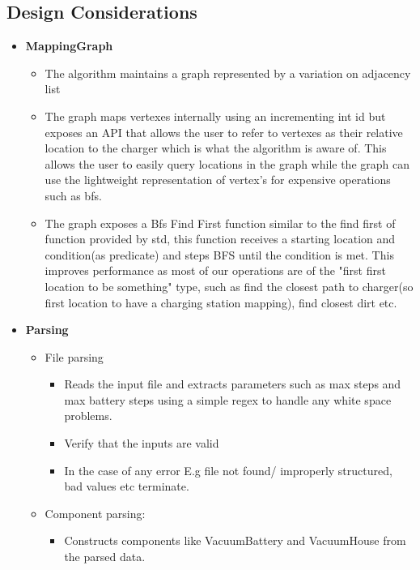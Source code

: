 \documentclass{article}
\begin{document}
\subsection{Design Considerations}
\begin{itemize}
    \item \textbf{MappingGraph}
        \begin{itemize}
            \item The algorithm maintains a graph represented by a variation on adjacency list
            \item The graph maps vertexes internally using an incrementing int id but exposes an API that allows the user to refer to vertexes as their relative location to the charger which is what the algorithm is aware of. This allows the user to easily query locations in the graph while the graph can use the lightweight representation of vertex's for expensive operations such as bfs.
            \item The graph exposes a Bfs Find First function similar to the find first of function provided by std, this function receives a starting location and condition(as predicate) and steps BFS until the condition is met. This improves performance as most of our operations are of the "first first location to be something" type, such as find the closest path to charger(so first location to have a charging station mapping), find closest dirt etc.
        \end{itemize}
        \item  \textbf{Parsing}
            \begin{itemize}
                \item File parsing
                    \begin{itemize}
                        \item Reads the input file and extracts parameters such as max steps and max battery steps using a simple regex to handle any white space problems.
                        \item Verify that the inputs are valid 
                        \item In the case of any error E.g file not found/ improperly structured, bad values etc terminate.
                    \end{itemize}
                \item Component parsing: 
                    \begin{itemize}
                        \item Constructs components like VacuumBattery and VacuumHouse from the parsed data.

\end{itemize}
\end{itemize}
\end{itemize}
\end{document}
